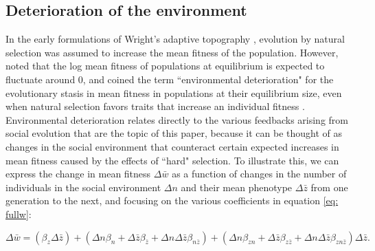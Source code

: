 \documentclass{article}
\begin{document}
\subsection{Deterioration of the environment}
In the early formulations of Wright's adaptive topography \citep{Wright1931}, evolution by natural selection was assumed to increase the mean fitness of the population. However, \cite{Fisher1930} noted that the log mean fitness of populations at equilibrium is expected to fluctuate around 0, and coined the term “environmental deterioration" for the evolutionary stasis in mean fitness in populations at their equilibrium size, even when natural selection favors traits that increase an individual fitness \citep{Slatkin1991}. Environmental deterioration relates directly to the various feedbacks arising from social evolution that are the topic of this paper, because it can be thought of as changes in the social environment that counteract certain expected increases in mean fitness caused by the effects of “hard" selection. To illustrate this, we can express the change in mean fitness $\Delta \bar{w}$ as a function of changes in the number of individuals in the social environment $\Delta n$ and their mean phenotype $\Delta \bar{z}$ from one generation to the next, and focusing on the various coefficients in equation \ref{eq: fullw}:  

\begin{equation} \label{eq: fisher}
\Delta \bar{w} =  (\beta_{z}\Delta \bar{z}) + (\Delta n\beta_{n} + \Delta \bar{z} \beta_{\bar{z}} + \Delta n \Delta \bar{z} \beta_{n\bar{z}}) + ( \Delta n  \beta_{zn} + \Delta \bar{z} \beta_{z\bar{z}} + \Delta n \Delta\bar{z} \beta_{zn\bar{z}})\Delta \bar{z}.
\end{equation}
\end{document}
